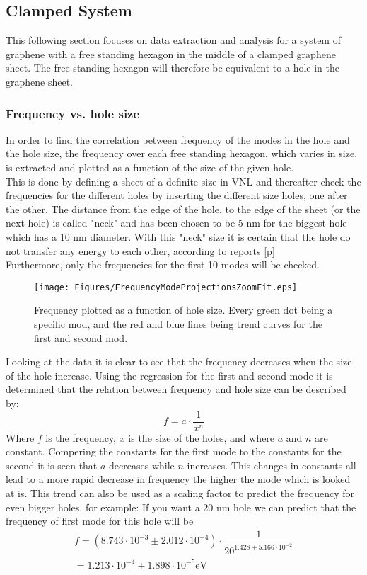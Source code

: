 \subsection{Clamped System}
This following section focuses on data extraction and analysis for a system of graphene with a free standing hexagon in the middle of a clamped graphene sheet. The free standing hexagon will therefore be equivalent to a hole in the graphene sheet.  
\subsubsection{Frequency vs. hole size}
In order to find the correlation between frequency of the modes in the hole and the hole size, the frequency over each free standing hexagon, which varies in size, is extracted and plotted as a function of the size of the given hole. \\
This is done by defining a sheet of a definite size in VNL and thereafter check the frequencies for the different holes by inserting the different size holes, one after the other. The distance from the edge of the hole, to the edge of the sheet (or the next hole) is called "neck" and has been chosen to be 5 nm for the biggest hole which has a 10 nm diameter. With this "neck" size it is certain that the hole do not transfer any energy to each other, according to reports \ref{p} \\
Furthermore, only the frequencies for the first 10 modes will be checked.
\onecolumngrid

\begin{figure}[H]
    \centering
    \texttt{[image: Figures/FrequencyModeProjectionsZoomFit.eps]}
    \caption{Frequency plotted as a function of hole size. Every green dot being a specific mod, and the red and blue lines being trend curves for the first and second mod.}
    \label{size vs frequency}
\end{figure}
\twocolumngrid
Looking at the data it is clear to see that the frequency decreases when the size of the hole increase. Using the regression for the first and second mode it is determined that the relation between frequency and hole size can be described by:
\begin{equation}
    f=a\cdot\dfrac{1}{x^n}
\end{equation}
Where $f$ is the frequency, $x$ is the size of the holes, and where $a$ and $n$ are constant. Compering the constants for the first mode to the constants for the second it is seen that $a$ decreases while $n$ increases. This changes in constants all lead to a more rapid decrease in frequency the higher the mode which is looked at is. This trend can also be used as a scaling factor to predict the frequency for even bigger holes, for example: If you want a 20 nm hole we can predict that the frequency of first mode for this hole will be
\begin{eqnarray*}
    f=\left(8.743\cdot10^{-3}\pm2.012\cdot10^{-4}\right)\cdot\dfrac{1}{20^{1.428\pm5.166\cdot10^{-2}}}\\=1.213\cdot10^{-4}\pm 1.898\cdot 10^{-5} \mathrm{eV}
\end{eqnarray*}

